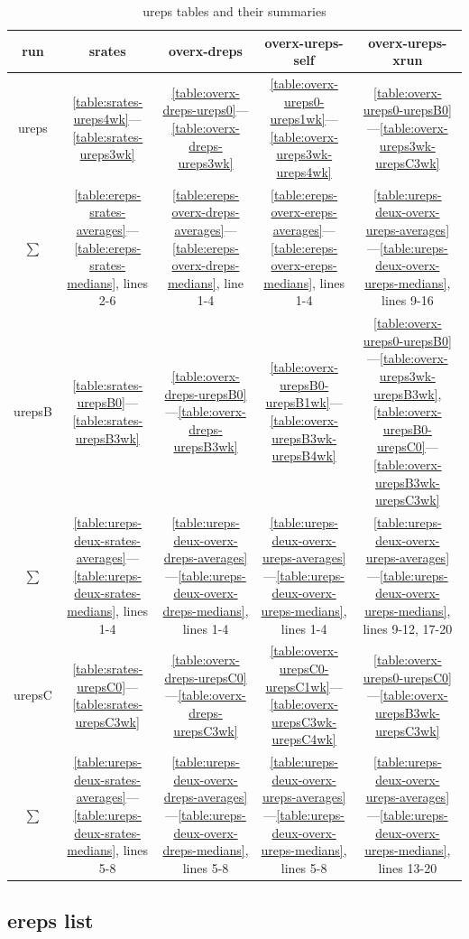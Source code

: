 \documentclass[10pt,oneside]{memoir}
\begin{document}
\begin{table}
\begin{tabular}{|ccccc|}
\toprule
run & srates & overx-dreps & overx-ureps-self & overx-ureps-xrun \\
\midrule
ureps & \ref{table:srates-ureps4wk}—\ref{table:srates-ureps3wk} & \ref{table:overx-dreps-ureps0}—\ref{table:overx-dreps-ureps3wk} & \ref{table:overx-ureps0-ureps1wk}—\ref{table:overx-ureps3wk-ureps4wk} & \ref{table:overx-ureps0-urepsB0}—\ref{table:overx-ureps3wk-urepsC3wk} \\
$\sum$ & \ref{table:ereps-srates-averages}—\ref{table:ereps-srates-medians}, lines 2-6 & \ref{table:ereps-overx-dreps-averages}—\ref{table:ereps-overx-dreps-medians}, line 1-4 & \ref{table:ereps-overx-ereps-averages}—\ref{table:ereps-overx-ereps-medians}, lines 1-4 & \ref{table:ureps-deux-overx-ureps-averages}—\ref{table:ureps-deux-overx-ureps-medians}, lines 9-16 \\
\hline
urepsB & \ref{table:srates-urepsB0}—\ref{table:srates-urepsB3wk} & \ref{table:overx-dreps-urepsB0}—\ref{table:overx-dreps-urepsB3wk} & \ref{table:overx-urepsB0-urepsB1wk}—\ref{table:overx-urepsB3wk-urepsB4wk} & \ref{table:overx-ureps0-urepsB0}—\ref{table:overx-ureps3wk-urepsB3wk}, \ref{table:overx-urepsB0-urepsC0}—\ref{table:overx-urepsB3wk-urepsC3wk} \\
$\sum$ & \ref{table:ureps-deux-srates-averages}—\ref{table:ureps-deux-srates-medians}, lines 1-4 & \ref{table:ureps-deux-overx-dreps-averages}—\ref{table:ureps-deux-overx-dreps-medians}, lines 1-4 & \ref{table:ureps-deux-overx-ureps-averages}—\ref{table:ureps-deux-overx-ureps-medians}, lines 1-4 & \ref{table:ureps-deux-overx-ureps-averages}—\ref{table:ureps-deux-overx-ureps-medians}, lines 9-12, 17-20 \\
\hline
urepsC & \ref{table:srates-urepsC0}—\ref{table:srates-urepsC3wk} & \ref{table:overx-dreps-urepsC0}—\ref{table:overx-dreps-urepsC3wk} & \ref{table:overx-urepsC0-urepsC1wk}—\ref{table:overx-urepsC3wk-urepsC4wk} & \ref{table:overx-ureps0-urepsC0}—\ref{table:overx-urepsB3wk-urepsC3wk} \\
$\sum$ & \ref{table:ureps-deux-srates-averages}—\ref{table:ureps-deux-srates-medians}, lines 5-8 & \ref{table:ureps-deux-overx-dreps-averages}—\ref{table:ureps-deux-overx-dreps-medians}, lines 5-8 & \ref{table:ureps-deux-overx-ureps-averages}—\ref{table:ureps-deux-overx-ureps-medians}, lines 5-8 & \ref{table:ureps-deux-overx-ureps-averages}—\ref{table:ureps-deux-overx-ureps-medians}, lines 13-20 \\
\bottomrule
\end{tabular}
\caption{ureps tables and their summaries}
\label{table:ureps-tables}
\end{table}
\pagebreak \subsection{ereps list}
\label{erepslist}
\end{document}
